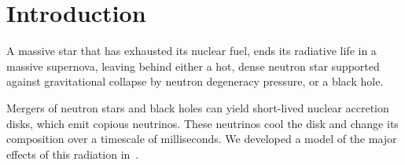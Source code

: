 \chapter{Introduction}
\label{chap:intro}

A massive star that has exhausted its nuclear fuel, ends its radiative life
in a massive supernova, leaving behind either a hot, dense neutron star supported
against gravitational collapse by neutron degeneracy pressure, or a black hole.

Mergers of neutron stars and black holes can yield short-lived nuclear accretion
disks, which emit copious neutrinos. These neutrinos cool the disk and change
its composition over a timescale of milliseconds. We developed a model of the
major effects of this radiation in~\cite{deat2013-leakage}.
